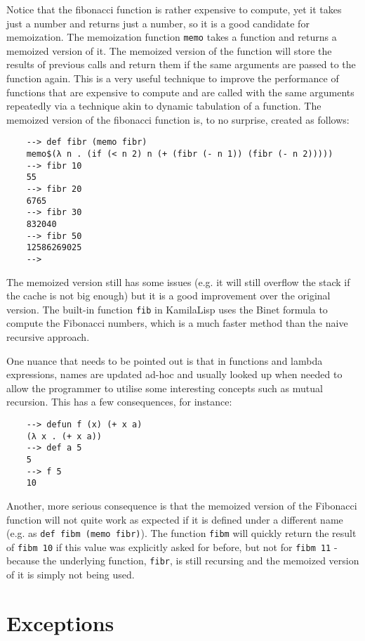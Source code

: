 Notice that the fibonacci function is rather expensive to compute, yet it takes just a number and returns just a number, so it is a good candidate for memoization. The memoization function \verb|memo| takes a function and returns a memoized version of it. The memoized version of the function will store the results of previous calls and return them if the same arguments are passed to the function again. This is a very useful technique to improve the performance of functions that are expensive to compute and are called with the same arguments repeatedly via a technique akin to dynamic tabulation of a function. The memoized version of the fibonacci function is, to no surprise, created as follows:

\begin{Verbatim}
    --> def fibr (memo fibr)
    memo$(λ n . (if (< n 2) n (+ (fibr (- n 1)) (fibr (- n 2)))))
    --> fibr 10
    55
    --> fibr 20
    6765
    --> fibr 30
    832040
    --> fibr 50
    12586269025
    -->
\end{Verbatim}

The memoized version still has some issues (e.g. it will still overflow the stack if the cache is not big enough) but it is a good improvement over the original version. The built-in function \verb|fib| in KamilaLisp uses the Binet formula to compute the Fibonacci numbers, which is a much faster method than the naive recursive approach.

One nuance that needs to be pointed out is that in functions and lambda expressions, names are updated ad-hoc and usually looked up when needed to allow the programmer to utilise some interesting concepts such as mutual recursion. This has a few consequences, for instance:

\begin{Verbatim}
    --> defun f (x) (+ x a)
    (λ x . (+ x a))
    --> def a 5
    5
    --> f 5
    10
\end{Verbatim}

Another, more serious consequence is that the memoized version of the Fibonacci function will not quite work as expected if it is defined under a different name (e.g. as \verb|def fibm (memo fibr)|). The function \verb|fibm| will quickly return the result of \verb|fibm 10| if this value was explicitly asked for before, but not for \verb|fibm 11| - because the underlying function, \verb|fibr|, is still recursing and the memoized version of it is simply not being used.

\section{Exceptions}

